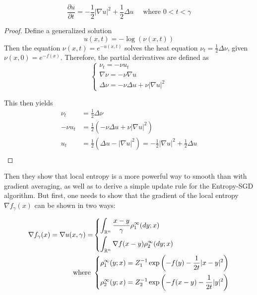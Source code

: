 \begin{equation*}
    \frac{\partial u}{\partial t} = -\frac{1}{2} | \nabla u |^2 + \frac{1}{2} \Delta u \quad \text{ where } 0 < t <\gamma \tag{viscous HJ}
\end{equation*}
 \begin{tcolorbox}[breakable]
\begin{proof}

Define a generalized solution
$$u(x,t) = - \log (\nu(x,t))$$
Then the equation $\nu(x,t) = e^{-u(x,t)}$ solves the heat equation $\nu_t = \frac{1}{2} \Delta \nu$, given $\nu(x,0) = e^{-f(x)}$. Therefore, the partial derivatives are defined as
\begin{equation*}
\begin{cases}
\nu_t = -\nu u_t  \\
\nabla \nu = -\nu \nabla u \\
\Delta \nu = - \nu \Delta u + \nu | \nabla u | ^2
\end{cases}
\end{equation*}

This then yields
\begin{align*}
    \nu_t &= \frac{1}{2} \Delta \nu \\
    -\nu u_t &= \frac{1}{2}\left( - \nu \Delta u + \nu | \nabla u | ^2 \right) \\
    u_t &= \frac{1}{2}\left( \Delta u - | \nabla u | ^2 \right) = - \frac{1}{2}  | \nabla u | ^2 + \frac{1}{2} \Delta u\\
\end{align*}
\end{proof}
\end{tcolorbox}

Then they show that local entropy is a more powerful way to smooth than with gradient averaging, as well as to derive a simple update rule for the Entropy-SGD algorithm. But first, one needs to show that the gradient of the local entropy $\nabla f_\gamma(x)$ can be shown in two ways:

\begin{align*}
\nabla f_\gamma(x) = \nabla u(x,\gamma) =&
\begin{dcases}
\int_{\mathbb{R}^n} \frac{x-y}{\gamma} \rho_1^\infty(dy;x) \\
\int_{\mathbb{R}^n} \nabla f(x-y) \rho_2^\infty(dy;x)
\end{dcases} \\
\text{ where }&
\begin{dcases}
\rho_1^\infty(y;x ) = Z_1^{-1} \exp\left( -f(y) - \frac{1}{2t} |x-y|^2 \right) \\
\rho_2^\infty(y;x ) = Z_2^{-1} \exp\left( -f(x-y) - \frac{1}{2t} |y|^2 \right) \\
\end{dcases}
\end{align*}

